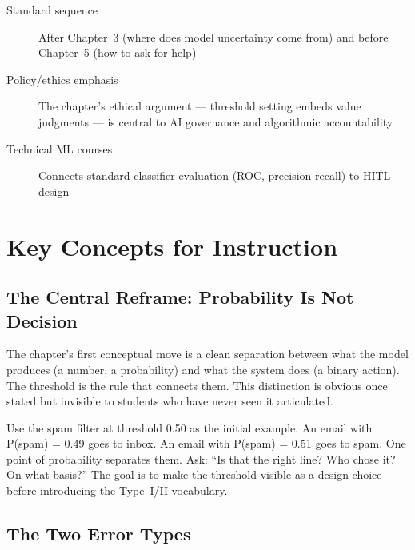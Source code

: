 \begin{description}
    \item[Standard sequence] After Chapter~3 (where does model uncertainty come from) and before Chapter~5 (how to ask for help)
    \item[Policy/ethics emphasis] The chapter's ethical argument --- threshold setting embeds value judgments --- is central to AI governance and algorithmic accountability
    \item[Technical ML courses] Connects standard classifier evaluation (ROC, precision-recall) to HITL design
\end{description}

\section{Key Concepts for Instruction}

\subsection{The Central Reframe: Probability Is Not Decision}

The chapter's first conceptual move is a clean separation between what the model produces (a number, a probability) and what the system does (a binary action). The threshold is the rule that connects them. This distinction is obvious once stated but invisible to students who have never seen it articulated.

\begin{technote}
Use the spam filter at threshold 0.50 as the initial example. An email with P(spam) = 0.49 goes to inbox. An email with P(spam) = 0.51 goes to spam. One point of probability separates them. Ask: ``Is that the right line? Who chose it? On what basis?'' The goal is to make the threshold visible as a design choice before introducing the Type~I/II vocabulary.
\end{technote}

\subsection{The Two Error Types}

